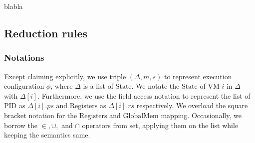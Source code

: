 \documentclass[a4paper]{article}
\newcommand*{\STATE}{\text{State}}
\newcommand*{\MEM}{\text{GlobalMem}}
\newcommand*{\PID}{\text{PID}}
\newcommand*{\REGS}{\text{Registers}}
\begin{document}
 blabla



\subsection{Reduction rules}
\subsubsection{Notations}
Except claiming explicitly, we use triple $(\Delta, m, s)$ to represent
execution configuration $\phi$, where $\Delta$ is a list of $\STATE$. We notate
the $\STATE$ of VM $i$ in $\Delta$ with $\Delta[i]$. Furthermore, we use the
field access notation to represent the list of $\PID$ as $\Delta[i].ps$ and
$\REGS$ as $\Delta[i].rs$ respectively. We overload the square bracket notation
for the $\REGS$ and $\MEM$ mapping. Occasionally, we borrow the $\in, \cup,$ and
$\cap$ operators from set, applying them on the list while keeping the semantics
same.

\end{document}
